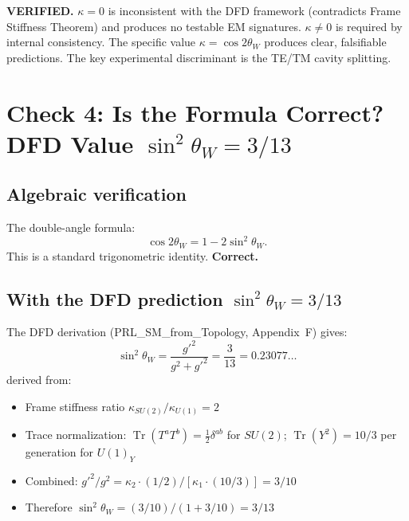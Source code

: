 \documentclass[aps,prd,twocolumn,superscriptaddress,nofootinbib]{revtex4-2}
\newcommand{\Tr}{\operatorname{Tr}}
\begin{document}
\begin{tcolorbox}[colback=green!5!white, colframe=green!60!black, title=Verdict: Check 3]
\textbf{VERIFIED.}  $\kappa = 0$ is inconsistent with the DFD
framework (contradicts Frame Stiffness Theorem) and produces no
testable EM signatures.  $\kappa \neq 0$ is required by internal
consistency.  The specific value $\kappa = \cos 2\theta_W$ produces
clear, falsifiable predictions.  The key experimental discriminant
is the TE/TM cavity splitting.
\end{tcolorbox}


\section{Check 4: Is the Formula Correct? DFD Value $\sin^2\theta_W = 3/13$}
\label{sec:check4}

\subsection{Algebraic verification}

The double-angle formula:
\begin{equation}
\cos 2\theta_W = 1 - 2\sin^2\theta_W.
\end{equation}
This is a standard trigonometric identity.  \textbf{Correct.}

\subsection{With the DFD prediction $\sin^2\theta_W = 3/13$}

The DFD derivation (PRL\_SM\_from\_Topology, Appendix~F) gives:
\begin{equation}
\sin^2\theta_W = \frac{g'^2}{g^2 + g'^2}
= \frac{3}{13} = 0.23077\ldots
\end{equation}
derived from:
\begin{itemize}
\item Frame stiffness ratio $\kappa_{SU(2)}/\kappa_{U(1)} = 2$
\item Trace normalization: $\Tr(T^a T^b) = \tfrac{1}{2}\delta^{ab}$
for $SU(2)$; $\Tr(Y^2) = 10/3$ per generation for $U(1)_Y$
\item Combined: $g'^2/g^2 = \kappa_2 \cdot (1/2) / [\kappa_1 \cdot (10/3)] = 3/10$
\item Therefore $\sin^2\theta_W = (3/10)/(1 + 3/10) = 3/13$
\end{itemize}
\end{document}
